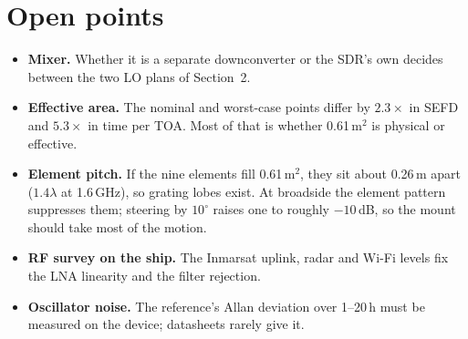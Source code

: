 \documentclass[11pt,a4paper]{article}
\begin{document}
\section{Open points}

\begin{itemize}
\item \textbf{Mixer.} Whether it is a separate downconverter or the SDR's own decides between the two LO
  plans of Section~2.
\item \textbf{Effective area.} The nominal and worst-case points differ by $2.3\times$ in SEFD and
  $5.3\times$ in time per TOA. Most of that is whether 0.61\,m$^2$ is physical or effective.
\item \textbf{Element pitch.} If the nine elements fill 0.61\,m$^2$, they sit about 0.26\,m apart
  ($1.4\lambda$ at 1.6\,GHz), so grating lobes exist. At broadside the element pattern suppresses them;
  steering by $10^\circ$ raises one to roughly $-10$\,dB, so the mount should take most of the motion.
\item \textbf{RF survey on the ship.} The Inmarsat uplink, radar and Wi-Fi levels fix the LNA linearity
  and the filter rejection.
\item \textbf{Oscillator noise.} The reference's Allan deviation over 1--20\,h must be measured on the
  device; datasheets rarely give it.
\end{itemize}
\end{document}
